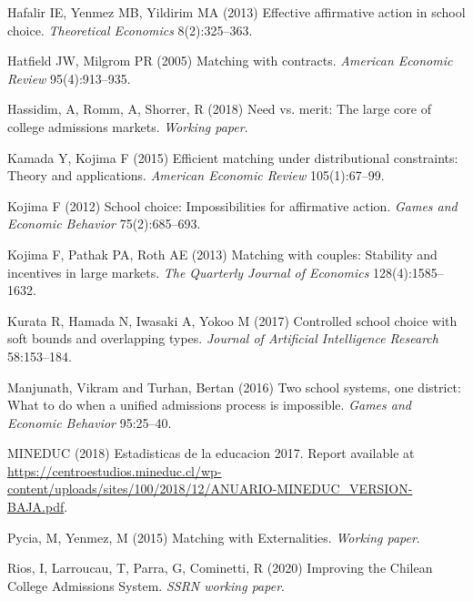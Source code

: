 \begin{thebibliography}{36}
Hafalir IE, Yenmez MB, Yildirim MA (2013) {Effective affirmative action in school choice}. \emph{Theoretical Economics} 8(2):325--363.

Hatfield JW, Milgrom PR (2005) Matching with contracts. \emph{American Economic
  Review} 95(4):913--935.


  Hassidim, A, Romm, A, Shorrer, R (2018) Need vs. merit: The large core of college admissions markets. \emph{Working paper}.

Kamada Y, Kojima F (2015) {Efficient matching under distributional constraints:
  Theory and applications}. \emph{American Economic Review} 105(1):67--99.

Kojima F (2012) {School choice: Impossibilities for affirmative action}.
  \emph{Games and Economic Behavior} 75(2):685--693.

Kojima F, Pathak PA, Roth AE (2013) Matching with couples: Stability and
  incentives in large markets. \emph{The Quarterly Journal of Economics} 128(4):1585--1632.

Kurata R, Hamada N, Iwasaki A, Yokoo M (2017) Controlled school choice with
  soft bounds and overlapping types. \emph{Journal of Artificial Intelligence Research} 58:153--184.


  Manjunath, Vikram and Turhan, Bertan (2016) Two school systems, one district: What to do when a unified admissions process is impossible. \emph{Games and Economic Behavior} 95:25--40.


MINEDUC (2018) Estadisticas de la educacion 2017. Report available at \url{https://centroestudios.mineduc.cl/wp-content/uploads/sites/100/2018/12/ANUARIO-MINEDUC_VERSION-BAJA.pdf}.

Pycia, M, Yenmez, M (2015) Matching with Externalities. \emph{Working paper}.


Rios, I, Larroucau, T, Parra, G, Cominetti, R (2020) Improving the Chilean College Admissions System. \emph{SSRN working paper}.



\end{thebibliography}
